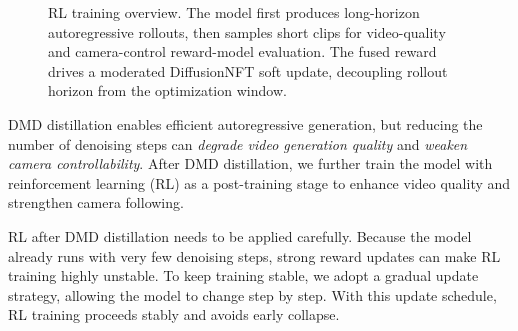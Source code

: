 \documentclass{llmxive}
\begin{document}
\begin{figure}[!htbp]
{%
}
\caption{RL training overview. The model first produces long-horizon autoregressive rollouts, then samples short clips for video-quality and camera-control reward-model evaluation. The fused reward drives a moderated DiffusionNFT soft update, decoupling rollout horizon from the optimization window.}
\label{fig:rl-alignment}
\end{figure}



DMD distillation enables efficient autoregressive generation,
but reducing the number of denoising steps can \emph{degrade video generation quality}
and \emph{weaken camera controllability}.
After DMD distillation,
we further train the model with reinforcement learning (RL) \citep{schulman2017proximal,chu2026gpg}
as a post-training stage to enhance video quality and strengthen camera following.

RL after DMD distillation needs to be applied carefully.
Because the model already runs with very few denoising steps,
strong reward updates can make RL training highly unstable.
To keep training stable, we adopt a gradual update strategy,
allowing the model to change step by step.
With this update schedule, RL training proceeds stably
and avoids early collapse.
\end{document}
